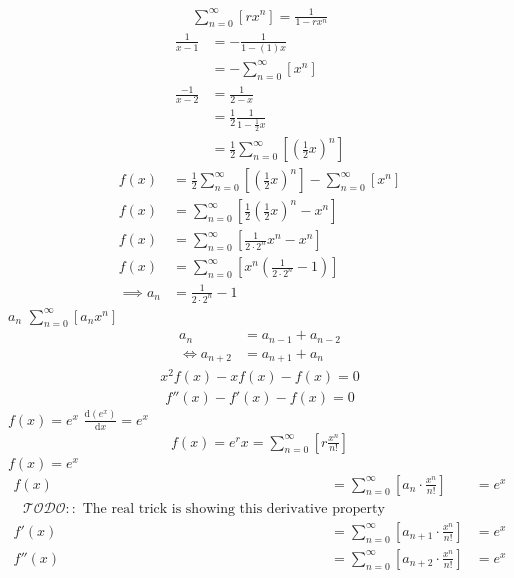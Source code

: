 \documentclass{article}
\begin{document}
$$\begin{align*}
\sum^{\infty}_{n= 0}\left[ rx^n \right] = \frac{1}{1- rx^n}
\end{align*}$$
$$\begin{align*}
\frac{1}{x- 1}&= -\frac{1}{1 -\left( 1 \right) x} \\
&= -\sum^{\infty}_{n= 0}\left[ x^n \right]  \\
\frac{-1}{x- 2} &= \frac{1}{2- x} \\
&= \frac{1}{2}\frac{1}{1-\frac{1}{2}x} \\
&= \frac{1}{2} \sum^{\infty}_{n= 0}\left[ \left( \frac{1}{2}x \right) ^n \right]
\end{align*}$$
$$\begin{align*}
f\left( x \right) &= \frac{1}{2}\sum^{\infty}_{n= 0}\left[ \left( \frac{1}{2}x \right) ^n \right] - \sum^{\infty}_{n= 0}\left[ x^n \right] \\
f\left( x \right) &= \sum^{\infty}_{n= 0}\left[ \frac{1}{2}\left( \frac{1}{2}x \right) ^n -x^n \right]  \\
f\left( x \right) &= \sum^{\infty}_{n= 0}\left[ \frac{1}{2 \cdot 2^n} x^n -x^n \right]  \\
f\left( x \right) &= \sum^{\infty}_{n= 0}\left[x^n {\left( {\frac{1}{2 \cdot 2^n} -1} \right) } \right]  \\
 \implies  a_n &= \frac{1}{2 \cdot 2^n} - 1
\end{align*}$$
$a_n$
$\sum^\infty_{n = 0} \left[ a_nx^n \right]$
\begin{align*}
    a_{n}&= a_{n - 1} + a_{n - 2}\\
\iff a_{n+  2} &= a_{n+  1} +  a_n
\end{align*}
\begin{align*}
x^2 f\left( x \right) -  x f \left( x \right) -  f\left( x \right)=  0
\end{align*}
\begin{align*}
f''\left( x \right)- f'\left( x \right)- f\left( x \right)=  0
\end{align*}
$f\left( x \right)= e^x$
$\frac{\mathrm{d}\left( e^x \right) }{\mathrm{d} x} = e^x$
\begin{align*}
f\left( x \right)= e^rx = \sum^{\infty}_{n= 0}   \left[ r \frac{x^n}{n!} \right]
\end{align*}
$f(x)=e^x$
\begin{align*}
    f\left( x \right) &=  \sum^{\infty}_{n= 0}   \left[ a_{n} \cdot  \frac{x^n}{n!} \right]   &= e^x \\
    \text{ $\mathcal{TODO::}$ The real trick is showing this derivative property } \\
    f'\left( x \right) &=  \sum^{\infty}_{n= 0}   \left[ a_{n+1} \cdot  \frac{x^n}{n!} \right]  &= e^x \\
    f''\left( x \right) &=  \sum^{\infty}_{n= 0}   \left[ a_{n+2} \cdot  \frac{x^n}{n!} \right] &= e^x \\
\end{align*}
\end{document}

